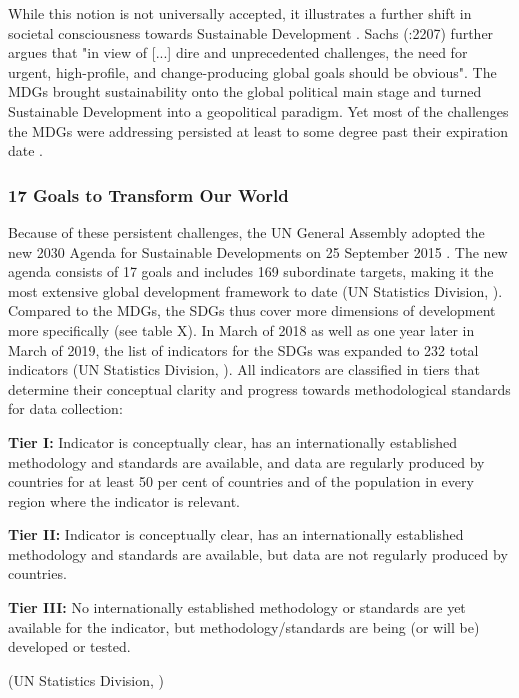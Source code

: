 		        \medskip
		        
		        While this notion is not universally accepted, it illustrates a further shift in societal consciousness towards Sustainable Development \citep{heikkurinen2019}. Sachs (\citeyear{sachs2012}:2207) further argues that "in view of [...] dire and unprecedented challenges, the need for urgent, high-profile, and change-producing global goals should be obvious". The MDGs brought sustainability onto the global political main stage and turned Sustainable Development into a geopolitical paradigm. Yet most of the challenges the MDGs were addressing persisted at least to some degree past their expiration date \citep{sachs2012}.
		        

		    \subsubsection{17 Goals to Transform Our World}
	            
	            Because of these persistent challenges, the UN General Assembly adopted the new 2030 Agenda for Sustainable Developments on 25 September 2015 \citep{unitednations2018}. The new agenda consists of 17 goals and includes 169 subordinate targets, making it the most extensive global development framework to date (UN Statistics Division, \citeyear{unitednationsstatisticsdivision2019a}). Compared to the MDGs, the SDGs thus cover more dimensions of development more specifically (see table X). In March of 2018 as well as one year later in March of 2019, the list of indicators for the SDGs was expanded to 232 total indicators (UN Statistics Division, \citeyear{unitednationsstatisticsdivision2019}). All indicators are classified in tiers that determine their conceptual clarity and progress towards methodological standards for data collection:
	            
	            \medskip
	            
	            \begin{tcolorbox}
    				\textbf{Tier I:} Indicator is conceptually clear, has an internationally established methodology and standards are available, and data are regularly produced by countries for at least 50 per cent of countries and of the population in every region where the indicator is relevant.
    				\medskip
    				
    				\textbf{Tier II:} Indicator is conceptually clear, has an internationally established methodology and standards are available, but data are not regularly produced by countries.
    				\medskip
    				
    				\textbf{Tier III:} No internationally established methodology or standards are yet available for the indicator, but methodology/standards are being (or will be) developed or tested.
    				
    				\begin{center}
    				    (UN Statistics Division, \citeyear{unitednationsstatisticsdivision2019b})
    				\end{center}
			    \end{tcolorbox}

